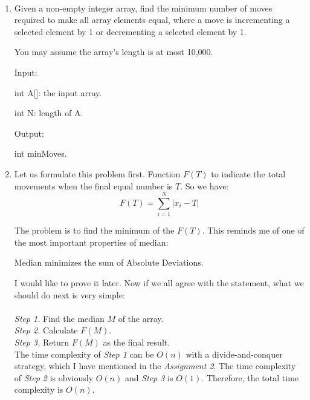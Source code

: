 \documentclass[12pt,a4paper]{article}
\makeatletter
\newtheorem*{solution}{Solution}
\renewenvironment{solution}[1][Solution] {\par\pushQED{\qed}\normalfont\topsep6\p@\@plus6\p@\relax\trivlist\item[\hskip\labelsep\bfseries#1\@addpunct{.}]\ignorespaces}{\popQED\endtrivlist\@endpefalse} \makeatother
\makeatother
\begin{document}
\noindent

\noindent{}


~\\
\begin{enumerate}

\item Given a non-empty integer array, find the minimum number of moves required to make all array elements equal, where a move is incrementing a selected element by 1 or decrementing a selected element by 1.

You may assume the array's length is at most 10,000.

Input:

int A[]: the input array.

int N: length of A.

Output:

int minMoves.


\begin{solution}
Let us formulate this problem first. Function $F(T)$ to indicate the total movements when the final equal number is $T$. So we have:\\
\begin{equation*}
F(T)= \sum_{i=1}^{N}|x_i-T|
\end{equation*}

The problem is to find the minimum of the $F(T)$. This reminds me of one of the most important properties of median: \begin{bf}{Median minimizes the sum of Absolute Deviations}. \end{bf} I would like to prove it later. Now if we all agree with the statement, what we should do next is very simple:\\\\
\emph{Step 1.} Find the median $M$ of the array.\\
\emph{Step 2.} Calculate $F(M)$.\\
\emph{Step 3.} Return $F(M)$ as the final result.\\

The time complexity of \emph{Step 1} can be $O(n)$ with a divide-and-conquer strategy, which I have mentioned in the \emph{Assignment 2}. The time complexity of \emph{Step 2} is obviously $O(n)$ and \emph{Step 3} is $O(1)$. Therefore, the total time complexity is $O(n)$.


\end{solution}
\end{enumerate}
\end{document}
